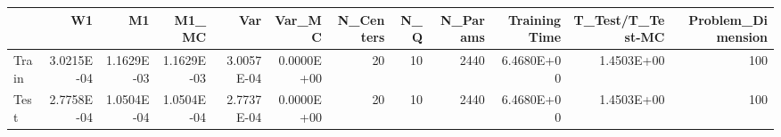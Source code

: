 \begin{tabular}{lrrrrrrrrrrr}
\toprule
{} &         W1 &         M1 &      M1\_MC &        Var &     Var\_MC &  N\_Centers &  N\_Q &  N\_Params &  Training Time &  T\_Test/T\_Test-MC &  Problem\_Dimension \\
\midrule
Train & 3.0215E-04 & 1.1629E-03 & 1.1629E-03 & 3.0057E-04 & 0.0000E+00 &         20 &   10 &      2440 &     6.4680E+00 &        1.4503E+00 &                100 \\
Test  & 2.7758E-04 & 1.0504E-04 & 1.0504E-04 & 2.7737E-04 & 0.0000E+00 &         20 &   10 &      2440 &     6.4680E+00 &        1.4503E+00 &                100 \\
\bottomrule
\end{tabular}
